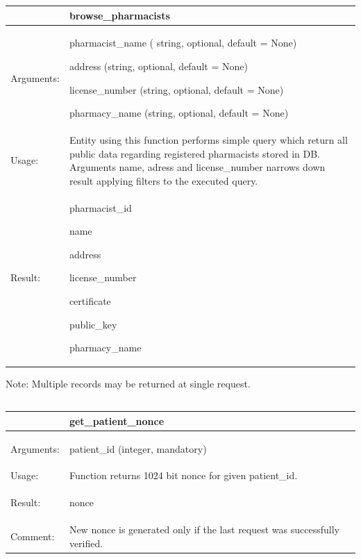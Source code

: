    \begin{longtable}{| p{3cm} | p{10.75cm} |}
    \hline
     & browse\_pharmacists \\ \hline
    Arguments: &  \begin{packed_enum}
    	\item pharmacist\_name ( string, optional, default = None)
		\item address (string, optional, default = None)
		\item license\_number (string, optional, default = None)
		\item pharmacy\_name (string, optional, default = None)

	\end{packed_enum}     \\ \hline
    Usage: & Entity using this function performs simple query which return all public data regarding registered pharmacists stored in DB. Arguments name, adress and license\_number narrows down result applying filters to the executed query. \\ \hline
    Result: & \begin{packed_enum}
    	\item pharmacist\_id
		\item name
		\item address
		\item license\_number
		\item certificate
		\item public\_key
		\item pharmacy\_name
	\end{packed_enum}     \\ \hline	
    \end{longtable}
Note: Multiple records may be returned at single request.

\subsection{}


    \begin{longtable}{| p{3cm} | p{10.75cm} |}
    \hline
     & get\_patient\_nonce \\ \hline
    Arguments: &  \begin{packed_enum}
    	\item patient\_id (integer, mandatory)
	\end{packed_enum}     \\ \hline
    Usage: & Function returns 1024 bit nonce for given patient\_id. \\ \hline
    Result: & \begin{packed_enum}
    	\item nonce
	\end{packed_enum}     \\ \hline	
			Comment: & New nonce is generated only if the last request was successfully verified.\\ \hline
    \end{longtable}


